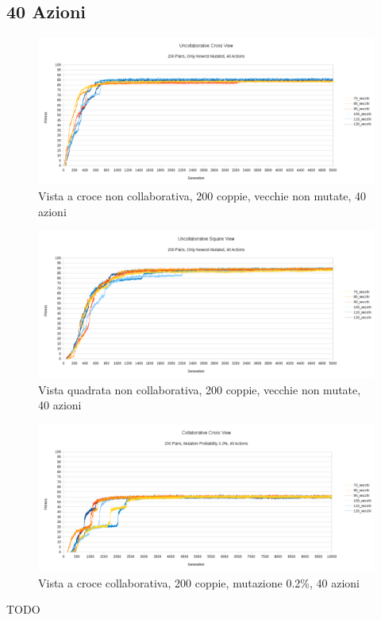 \subsection{40 Azioni}
\begin{figure}[ht]
	\centering
	\includegraphics[scale=0.7,angle=90]{imgs/cross_nc_200_pairs_70_120_old_not_mutated_40_actions.png}
	\caption{Vista a croce non collaborativa, 200 coppie, vecchie non mutate, 40 azioni}
	\label{figure:cross_nc_200_70_120_non_40_actions}
\end{figure}
\begin{figure}[ht]
	\centering
	\includegraphics[scale=0.7,angle=90]{imgs/square_nc_200_pairs_70_120_old_not_mutated_40_actions.png}
	\caption{Vista quadrata non collaborativa, 200 coppie, vecchie non mutate, 40 azioni}
	\label{figure:square_nc_200_70_120_non_40_actions}
\end{figure}
\begin{figure}[ht]
	\centering
	\includegraphics[scale=0.7,angle=90]{imgs/cross_c_200_pairs_70_120_old_02_mutation_40_actions.png}
	\caption{Vista a croce collaborativa, 200 coppie, mutazione 0.2\%, 40 azioni}
	\label{figure:cross_c_200_70_120_mutation_02_40_actions}
\end{figure}
TODO

